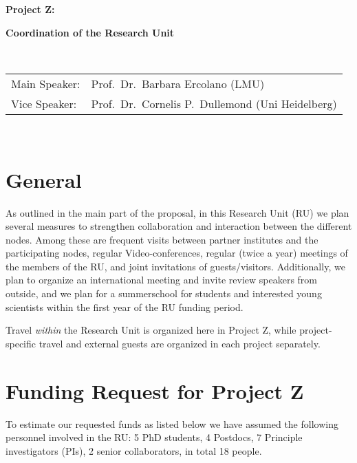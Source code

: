 \documentclass[10pt,fleqn,twoside]{article}
\begin{document}
\newpage


\setcounter{page}{177}

\centerline{\huge\bf\Tcol
%
%
%
%
%
 Project Z:}
\vspace{1em}

\centerline{\LARGE\bf\Tcol Coordination of the Research Unit}

%
%
%
%
%
\vskip1.0cm


\\
\begin{tabular}{ll}
{\textsf{Main Speaker:}}   & Prof.\ Dr.\ Barbara Ercolano (LMU)\\
{\textsf{Vice Speaker:}}   & Prof.\ Dr.\ Cornelis P.~Dullemond (Uni Heidelberg)
\end{tabular}


\vspace{1em}
 \\


\section{General}
%
As outlined in the main part of the proposal, in this Research Unit (RU) we
plan several measures to strengthen collaboration and interaction between
the different nodes.  Among these are frequent visits between partner
institutes and the participating nodes, regular Video-conferences, regular
(twice a year) meetings of the members of the RU, and joint invitations of
guests/visitors. Additionally, we plan to organize an international meeting
and invite review speakers from outside, and we plan for a summerschool for
students and interested young scientists within the first year of the RU
funding period.

Travel {\em within} the Research Unit is organized here in Project Z, 
while project-specific travel and external guests are organized in each
project separately. 



%
\section{Funding Request for Project Z}
%
To estimate our requested funds as listed below we have assumed the
following personnel involved in the RU: 5 PhD students, 4 Postdocs, 7
Principle investigators (PIs), 2 senior collaborators, in total 18 people.
\end{document}
